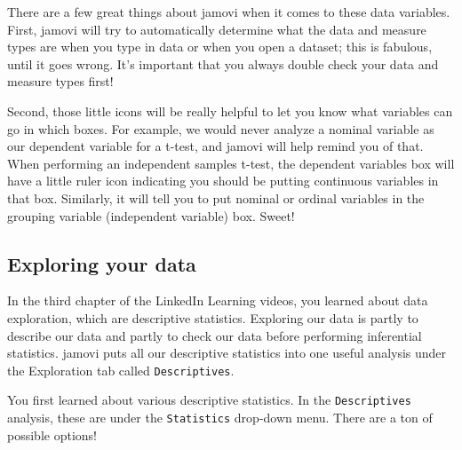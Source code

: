 \documentclass[
]{book}
\begin{document}
There are a few great things about jamovi when it comes to these data variables. First, jamovi will try to automatically determine what the data and measure types are when you type in data or when you open a dataset; this is fabulous, until it goes wrong. It's important that you always double check your data and measure types first!

Second, those little icons will be really helpful to let you know what variables can go in which boxes. For example, we would never analyze a nominal variable as our dependent variable for a t-test, and jamovi will help remind you of that. When performing an independent samples t-test, the dependent variables box will have a little ruler icon indicating you should be putting continuous variables in that box. Similarly, it will tell you to put nominal or ordinal variables in the grouping variable (independent variable) box. Sweet!

\hypertarget{exploring-your-data}{%
\subsection{Exploring your data}\label{exploring-your-data}}

In the third chapter of the LinkedIn Learning videos, you learned about data exploration, which are descriptive statistics. Exploring our data is partly to describe our data and partly to check our data before performing inferential statistics. jamovi puts all our descriptive statistics into one useful analysis under the Exploration tab called \texttt{Descriptives}.

You first learned about various descriptive statistics. In the \texttt{Descriptives} analysis, these are under the \texttt{Statistics} drop-down menu. There are a ton of possible options!
\end{document}

